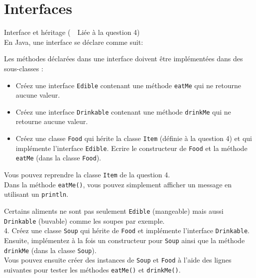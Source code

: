 \section{Interfaces}
\begin{Exercice}[15 minutes]{Interface et héritage (\faLink~~Liée à la question 4)}\\

En Java, une interface se déclare comme suit:
 

Les méthodes déclarées dans une interface doivent être implémentées dans des sous-classes :

 
\begin{itemize}
	\item Créez une interface \lstinline{Edible} contenant une méthode \lstinline{eatMe} qui ne retourne aucune valeur.
	\item Créez une interface \lstinline{Drinkable} contenant une méthode \lstinline{drinkMe} qui ne retourne aucune valeur.
	\item Créez une classe \lstinline{Food} qui hérite la classe \lstinline{Item} (définie à la question 4) et qui implémente l'interface \lstinline{Edible}. Ecrire le constructeur de \lstinline{Food} et la méthode \lstinline{eatMe} (dans la classe \lstinline{Food}).
\end{itemize}

\begin{conseil}
Vous pouvez reprendre la classe \lstinline{Item} de la question 4.\\
Dans la méthode \lstinline{eatMe()}, vous pouvez simplement afficher un message en utilisant un \lstinline{println}.
\end{conseil}

Certains aliments ne sont pas seulement \lstinline{Edible} (mangeable) mais aussi \lstinline{Drinkable} (buvable) comme les soupes par exemple.\\

4. Créez une classe \lstinline{Soup} qui hérite de \lstinline{Food} et implémente l'interface \lstinline{Drinkable}. Ensuite, implémentez à la fois un constructeur pour \lstinline{Soup} ainsi que la méthode \lstinline{drinkMe} (dans la classe \lstinline{Soup}).\\

Vous pouvez ensuite créer des instances de \lstinline{Soup} et \lstinline{Food} à l'aide des lignes suivantes pour tester les méthodes \lstinline{eatMe()} et \lstinline{drinkMe()}.
 

\begin{solution}
 
\end{solution}
\end{Exercice}

